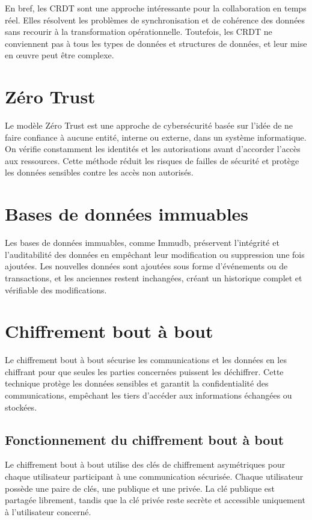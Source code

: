 En bref, les CRDT sont une approche intéressante pour la collaboration en temps réel. Elles résolvent les problèmes de synchronisation et de cohérence des données sans recourir à la transformation opérationnelle. Toutefois, les CRDT ne conviennent pas à tous les types de données et structures de données, et leur mise en œuvre peut être complexe.

\section{Zéro Trust}
Le modèle Zéro Trust est une approche de cybersécurité basée sur l'idée de ne faire confiance à aucune entité, interne ou externe, dans un système informatique. On vérifie constamment les identités et les autorisations avant d'accorder l'accès aux ressources. Cette méthode réduit les risques de failles de sécurité et protège les données sensibles contre les accès non autorisés.

\section{Bases de données immuables}
Les bases de données immuables, comme Immudb, préservent l'intégrité et l'auditabilité des données en empêchant leur modification ou suppression une fois ajoutées. Les nouvelles données sont ajoutées sous forme d'événements ou de transactions, et les anciennes restent inchangées, créant un historique complet et vérifiable des modifications.

\section{Chiffrement bout à bout}
Le chiffrement bout à bout sécurise les communications et les données en les chiffrant pour que seules les parties concernées puissent les déchiffrer. Cette technique protège les données sensibles et garantit la confidentialité des communications, empêchant les tiers d'accéder aux informations échangées ou stockées.

\subsection{Fonctionnement du chiffrement bout à bout}
Le chiffrement bout à bout utilise des clés de chiffrement asymétriques pour chaque utilisateur participant à une communication sécurisée. Chaque utilisateur possède une paire de clés, une publique et une privée. La clé publique est partagée librement, tandis que la clé privée reste secrète et accessible uniquement à l'utilisateur concerné.

